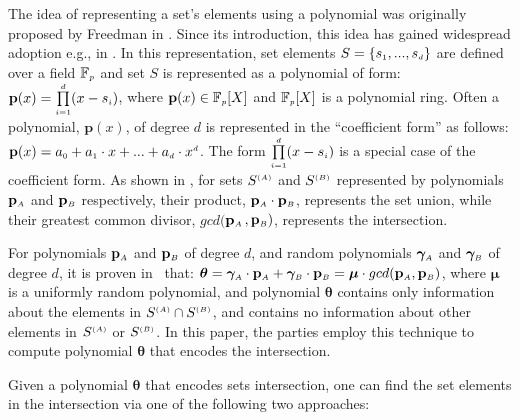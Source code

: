 The idea of representing a set's elements using a polynomial was originally proposed by Freedman  \et in \cite{DBLP:conf/eurocrypt/FreedmanNP04}. Since its introduction, this idea has gained widespread adoption  e.g., in \cite{GhoshS19,DBLP:conf/crypto/KissnerS05}. In this representation, set elements $S=\{s_{\scriptscriptstyle 1},...,s_{\scriptscriptstyle d}\}$ are defined over a field $\mathbb{F}_{\scriptscriptstyle p}$ and  set $S$ is represented as a polynomial of   form: $\mathbf{p}(x)=\prod\limits ^{\scriptscriptstyle {d}}_{\scriptscriptstyle i=1}(x-s_{\scriptscriptstyle i})$, where $\mathbf{p}(x) \in \mathbb{F}_{\scriptscriptstyle p}[X]$ and $\mathbb{F}_{\scriptscriptstyle p}[X]$ is a polynomial ring.  Often a   polynomial,  $\mathbf{p}(x)$, of degree $d$ is  represented in the ``coefficient form'' as follows:  $\mathbf{p}(x)=a_{\scriptscriptstyle 0}+a_{\scriptscriptstyle 1}\cdot x+...+ a_{\scriptscriptstyle d}\cdot x^{\scriptscriptstyle d}$.  The form $\prod\limits ^{\scriptscriptstyle {d}}_{\scriptscriptstyle i=1}(x-s_{\scriptscriptstyle i})$ is a special case of the coefficient form. As shown in \cite{BonehGHWW13,DBLP:conf/crypto/KissnerS05}, for sets $S^{\scriptscriptstyle (A)}$ and $S^{\scriptscriptstyle (B)}$ represented by polynomials $\mathbf{p}_{\scriptscriptstyle A}$ and $\mathbf{p}_{\scriptscriptstyle B}$ respectively, their product, $\mathbf{p}_{\scriptscriptstyle A}\cdot \mathbf{p}_{\scriptscriptstyle  B}$,  represents the set union, while their greatest common divisor, $gcd($$\mathbf{p}_{\scriptscriptstyle A}$$,\mathbf{p}_{\scriptscriptstyle B})$, represents the intersection. 

For polynomials $\mathbf{p}_{\scriptscriptstyle A}$ and $\mathbf{p}_{\scriptscriptstyle B}$ of degree $d$, and random polynomials $\bm\gamma_{\scriptscriptstyle A}$ and  $\bm\gamma_{\scriptscriptstyle B}$ of degree $d$, it is proven in~\cite{BonehGHWW13,DBLP:conf/crypto/KissnerS05} that: $\bm\theta=\bm\gamma_{\scriptscriptstyle A}\cdot \mathbf{p}_{\scriptscriptstyle A}+\bm\gamma_{\scriptscriptstyle B}\cdot\mathbf{p}_{\scriptscriptstyle B}=\bm\mu\cdot gcd(\mathbf{p}_{\scriptscriptstyle A},\mathbf{p}_{\scriptscriptstyle B})$, where $\bm\mu$ is a uniformly random polynomial, and polynomial $\bm\theta$ contains only information about the elements in  $S^{\scriptscriptstyle (A)}\cap S^{\scriptscriptstyle (B)}$, and contains no information about other elements in $S^{\scriptscriptstyle (A)}$ or $S^{\scriptscriptstyle (B)}$.  {In this paper, the parties employ this technique to compute polynomial $\bm\theta$ that encodes the intersection}. 

Given a polynomial $\bm\theta$ that encodes sets intersection, one can find the set elements in the intersection via one of the following two approaches: 


